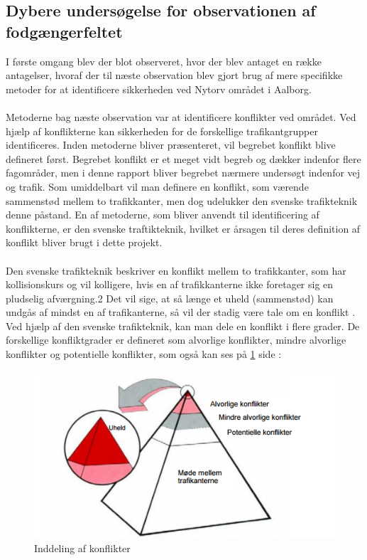 \subsection{Dybere undersøgelse for observationen af fodgængerfeltet}
\label{sub:dyb_undersoelse}
I første omgang blev der blot observeret, hvor der blev antaget en række antagelser, hvoraf der til næste observation blev gjort brug af mere specifikke metoder for at identificere sikkerheden ved Nytorv området i Aalborg.
~\\\\
Metoderne bag næste observation var at identificere konflikter ved området. Ved hjælp af konflikterne kan sikkerheden for de forskellige trafikantgrupper identificeres. Inden metoderne bliver præsenteret, vil begrebet konflikt blive defineret først. Begrebet konflikt er et meget vidt begreb og dækker indenfor flere fagområder, men i denne rapport bliver begrebet nærmere undersøgt indenfor vej og trafik. Som umiddelbart vil man definere en konflikt, som værende sammenstød mellem to trafikkanter, men dog udelukker den svenske trafikteknik denne påstand. \autocite{sweconflict}
En af metoderne, som bliver anvendt til identificering af konflikterne, er den svenske traftikteknik, hvilket er årsagen til deres definition af konflikt bliver brugt i dette projekt.
~\\\\
Den svenske trafikteknik beskriver en konflikt mellem to trafikkanter, som har kollisionskurs og vil kolligere, hvis en af trafikkanterne ikke foretager sig en pludselig afværgning.2 Det vil sige, at så længe et uheld (sammenstød) kan undgås af mindst en af trafikanterne, så vil der stadig være tale om en konflikt \autocite{sweconflict}. Ved hjælp af den svenske trafikteknik, kan man dele en konflikt i flere grader. De forskellige konfliktgrader er defineret som alvorlige konflikter, mindre alvorlige konflikter og potentielle konflikter, som også kan ses på \cref{fig:indellingkonflikter} side \pageref{fig:indellingkonflikter}:
 \begin{figure}[htbp]
   \centering
   \begin{adjustbox}{max width=\textwidth}
     \includegraphics{figures/Billederogfigur/konflikt.png} %
  \end{adjustbox}
   \caption{Inddeling af konflikter \autocite{konfli}}
    \label{fig:indellingkonflikter}
 \end{figure}
 \newpage



